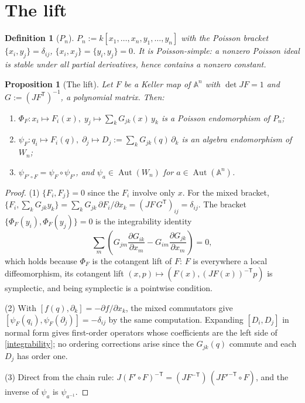 \documentclass[11pt]{article}
\theoremstyle{change}
\newtheorem{definition}[equation]{Definition}
\newtheorem{prop}[equation]{Proposition}
\theoremstyle{nonumberplain}
\newtheorem{proof}{Proof}
\renewcommand\AA{{\mathbb A}}
\DeclareMathOperator{\Aut}{Aut}
\begin{document}
\section{The lift\label{liftsec}}

\begin{definition}[$P_n$]
$P_n := k[x_1, \dots, x_n, y_1, \dots, y_n]$ with the Poisson bracket $\{x_i, y_j\} = \delta_{ij}$, $\{x_i,x_j\} = \{y_i,y_j\} = 0$. It is Poisson-simple: a nonzero Poisson ideal is stable under all partial derivatives, hence contains a nonzero constant.
\end{definition}

\begin{prop}[The lift\label{lift}]
Let $F$ be a Keller map of $\AA^n$ with $\det JF = 1$ and $G := (JF^{\mathsf{T}})^{-1}$, a polynomial matrix. Then:
\begin{enumerate}
\item $\Phi_F : x_i \mapsto F_i(x), \; y_j \mapsto \sum_k G_{jk}(x)\, y_k$ is a Poisson endomorphism of $P_n$;
\item $\psi_F : q_i \mapsto F_i(q), \; \partial_j \mapsto D_j := \sum_k G_{jk}(q)\, \partial_k$ is an algebra endomorphism of $W_n$;
\item $\psi_{F' \circ F} = \psi_F \circ \psi_{F'}$, and $\psi_a \in \Aut(W_n)$ for $a \in \Aut(\AA^n)$.
\end{enumerate}
\end{prop}

\begin{proof}
(1) $\{F_i, F_j\} = 0$ since the $F_i$ involve only $x$. For the mixed bracket, $\{F_i, \sum_k G_{jk} y_k\} = \sum_k G_{jk}\, \partial F_i / \partial x_k = (JF \, G^{\mathsf{T}})_{ij} = \delta_{ij}$. The bracket $\{\Phi_F(y_i), \Phi_F(y_j)\} = 0$ is the integrability identity
\begin{equation}\label{integrability}
\sum_m \left( G_{jm} \frac{\partial G_{ik}}{\partial x_m} - G_{im} \frac{\partial G_{jk}}{\partial x_m} \right) = 0,
\end{equation}
which holds because $\Phi_F$ is the cotangent lift of $F$: $F$ is everywhere a local diffeomorphism, its cotangent lift $(x,p) \mapsto (F(x), (JF(x))^{-\mathsf T} p)$ is symplectic, and being symplectic is a pointwise condition.

(2) With $[f(q), \partial_k] = -\partial f / \partial x_k$, the mixed commutators give $[\psi_F(q_i), \psi_F(\partial_j)] = -\delta_{ij}$ by the same computation. Expanding $[D_i, D_j]$ in normal form gives first-order operators whose coefficients are the left side of \cref{integrability}; no ordering corrections arise since the $G_{jk}(q)$ commute and each $D_j$ has order one.

(3) Direct from the chain rule: $J(F' \circ F)^{-\mathsf T} = (JF^{-\mathsf T})\, (JF'^{-\mathsf T} \circ F)$, and the inverse of $\psi_a$ is $\psi_{a^{-1}}$.
\end{proof}
\end{document}
